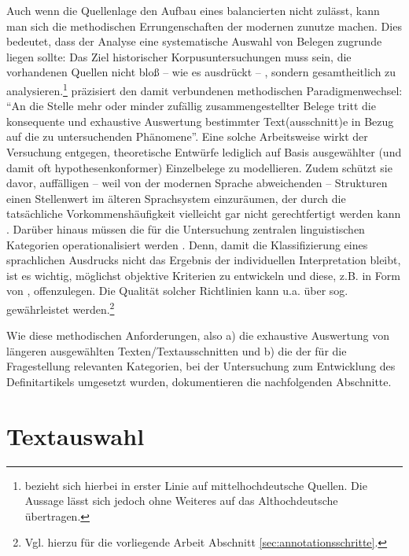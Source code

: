 Auch wenn die Quellenlage den Aufbau eines balancierten  nicht zulässt, kann man sich die methodischen Errungenschaften der modernen  zunutze machen. Dies bedeutet, dass der Analyse eine systematische Auswahl von Belegen zugrunde liegen sollte: Das Ziel historischer Korpusuntersuchungen  muss sein, die vorhandenen Quellen nicht bloß -- wie es \textcite[1310]{Wegera2000} ausdrückt -- , sondern gesamtheitlich zu analysieren.\footnote{\textcite{Wegera2000} bezieht sich hierbei in erster Linie auf mittelhochdeutsche Quellen. Die Aussage lässt sich jedoch ohne Weiteres auf das Althochdeutsche übertragen.} \textcite[382]{Fleischer2015} präzisiert den damit verbundenen methodischen Paradigmenwechsel:
"`An die Stelle mehr oder minder zufällig zusammengestellter Belege tritt die konsequente und exhaustive Auswertung bestimmter Text(ausschnitt)e in Bezug auf die zu untersuchenden Phänomene"'. Eine solche Arbeitsweise wirkt der Versuchung entgegen, theoretische Entwürfe lediglich auf Basis ausgewählter (und damit oft hypothesenkonformer) Einzelbelege zu modellieren. Zudem schützt sie davor, auffälligen -- weil von der modernen Sprache abweichenden -- Strukturen einen Stellenwert im älteren Sprachsystem einzuräumen, der durch die tatsächliche Vorkommenshäufigkeit vielleicht gar nicht gerechtfertigt werden kann \parencite[383]{Fleischer2015}. Darüber hinaus müssen die für die Untersuchung zentralen linguistischen Kategorien operationalisiert  werden  \parencite[113--116]{Lemnitzer2015}. Denn, damit die Klassifizierung eines sprachlichen Ausdrucks nicht das Ergebnis der individuellen Interpretation bleibt, ist es wichtig, möglichst objektive Kriterien zu entwickeln und diese, z.B. in Form von , offenzulegen. Die Qualität solcher Richtlinien kann u.a. über sog.  gewährleistet  werden.\footnote{Vgl. hierzu für die vorliegende Arbeit Abschnitt \ref{sec:annotationsschritte}.} 

Wie diese methodischen Anforderungen, also a) die exhaustive Auswertung von längeren ausgewählten Texten/Textausschnitten und b) die  der für die Fragestellung relevanten Kategorien, bei der Untersuchung zum Entwicklung des Definitartikels  umgesetzt wurden, dokumentieren die nachfolgenden Abschnitte.


\section{Textauswahl}\label{sec:textauswahl}

